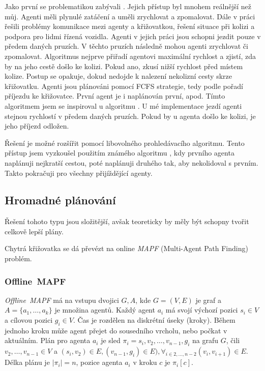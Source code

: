 Jako první se problematikou zabývali \citet*{Dresner}.
Jejich přístup byl mnohem reálnější než můj.
Agenti měli plynulé zatáčení a uměli zrychlovat a zpomalovat.
Dále \citet{Dresner} v práci řešili problémy komunikace mezi agenty a křižovatkou, řešení situace při kolizi a podpora pro lidmi řízená vozidla.
Agenti v jejich práci jsou schopni jezdit pouze v předem daných pruzích.
V těchto pruzích následně mohou agenti zrychlovat či zpomalovat.
Algoritmus nejprve přiřadí agentovi maximální rychlost a zjistí, zda by na jeho cestě došlo ke kolizi.
Pokud ano, zkusí nižší rychlost před místem kolize.
Postup se opakuje, dokud nedojde k nalezení nekolizní cesty skrze křižovatku.
Agenti jsou plánováni pomocí FCFS strategie, tedy podle pořadí příjezdu ke křižovatce.
První agent je i naplánován první, apod.
Tímto algoritmem jsem se inspiroval u algoritmu .
U mé implementace jezdí agenti stejnou rychlostí v předem daných pruzích.
Pokud by u agenta došlo ke kolizi, je jeho příjezd odložen.

Řešení je možné rozšířit pomocí libovolného prohledávacího algoritmu.
Tento přístup jsem vyzkoušel použitím známého algoritmu ,
kdy prvního agenta naplánuji nejkratší cestou, poté naplánuji druhého tak, aby nekolidoval s prvním.
Takto pokračuji pro všechny přijíždějící agenty.

\subsection{Hromadné plánování}\label{subsec:hromadne_planovani}

Řešení tohoto typu jsou složitější, avšak teoreticky by měly být schopny tvořit celkově lepší plány.

Chytrá křižovatka se dá převézt na online \emph{MAPF} (Multi-Agent Path Finding) problém.

\subsubsection{Offline~MAPF}\label{subsubsec:offline-mapf}

\emph{Offline~MAPF} má na vstupu dvojici $G, A$, kde $G=(V, E)$ je graf a $A = \{a_1, \dots, a_k\}$ je množina agentů.
Každý agent $a_i$ má svojí výchozí pozici $s_i \in V$ a cílovou pozici $g_i \in V$.
Čas je rozdělen na diskrétní úseky (kroky).
Během jednoho kroku může agent přejet do sousedního vrcholu, nebo počkat v aktuálním.
Plán pro agenta $a_i$ je sled $\pi_i = s_i, v_2, \dots, v_{n-1}, g_i$ na grafu $G$, čili $v_2, \dots, v_{n-1} \in V$ a
$(s_i, v_2) \in E, (v_{n-1}, g_i) \in E), \forall_{i \in 2, \dots, n-2} (v_i, v_{i+1}) \in E$.
Délka plánu je $|\pi_i| = n$, pozice agenta $a_i$ v kroku $c$ je $\pi_i[c]$.

